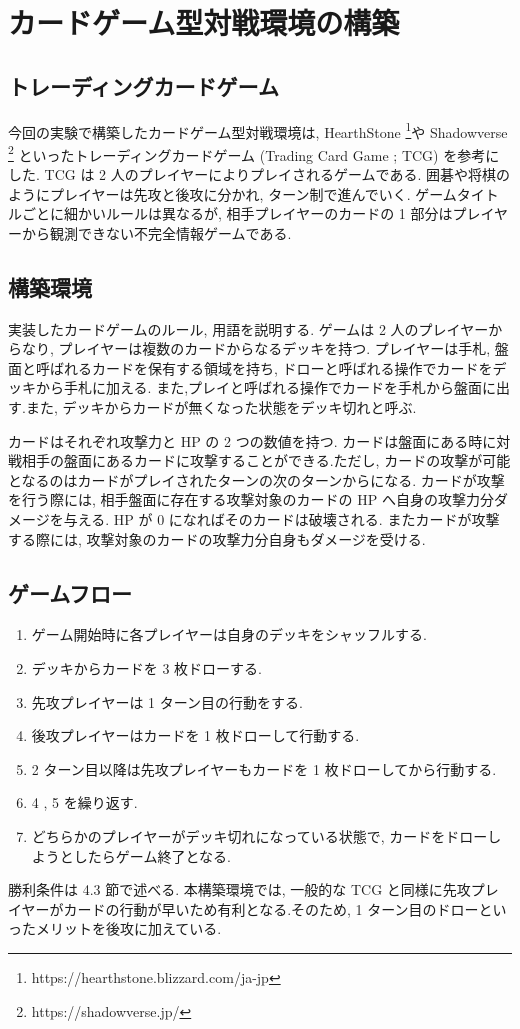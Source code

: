 \documentclass[twocolumn]{jarticle}
\begin{document}
\section{カードゲーム型対戦環境の構築}
\subsection{トレーディングカードゲーム}
今回の実験で構築したカードゲーム型対戦環境は, HearthStone \footnote[1]{https://hearthstone.blizzard.com/ja-jp}や Shadowverse \footnote[2]{https://shadowverse.jp/} といったトレーディングカードゲーム (Trading Card Game ; TCG) を参考にした. TCG は 2 人のプレイヤーによりプレイされるゲームである. 囲碁や将棋のようにプレイヤーは先攻と後攻に分かれ, ターン制で進んでいく. 
ゲームタイトルごとに細かいルールは異なるが, 相手プレイヤーのカードの 1 部分はプレイヤーから観測できない不完全情報ゲームである.

\subsection{構築環境}
実装したカードゲームのルール, 用語を説明する.
ゲームは 2 人のプレイヤーからなり, プレイヤーは複数のカードからなるデッキを持つ.
プレイヤーは手札, 盤面と呼ばれるカードを保有する領域を持ち, ドローと呼ばれる操作でカードをデッキから手札に加える. また,プレイと呼ばれる操作でカードを手札から盤面に出す.また, デッキからカードが無くなった状態をデッキ切れと呼ぶ.
\par
カードはそれぞれ攻撃力と HP の 2 つの数値を持つ. カードは盤面にある時に対戦相手の盤面にあるカードに攻撃することができる.ただし, カードの攻撃が可能となるのはカードがプレイされたターンの次のターンからになる. カードが攻撃を行う際には, 相手盤面に存在する攻撃対象のカードの HP へ自身の攻撃力分ダメージを与える. HP が 0 になればそのカードは破壊される. またカードが攻撃する際には, 攻撃対象のカードの攻撃力分自身もダメージを受ける.

\subsection{ゲームフロー}
\begin{enumerate}
  \setlength{\itemsep}{0cm} %
  \item ゲーム開始時に各プレイヤーは自身のデッキをシャッフルする.
  \item デッキからカードを 3 枚ドローする.
  \item 先攻プレイヤーは 1 ターン目の行動をする.
  \item 後攻プレイヤーはカードを 1 枚ドローして行動する.
  \item 2 ターン目以降は先攻プレイヤーもカードを 1 枚ドローしてから行動する.
  \item 4 , 5 を繰り返す.
  \item どちらかのプレイヤーがデッキ切れになっている状態で, カードをドローしようとしたらゲーム終了となる.
\end{enumerate}
勝利条件は 4.3 節で述べる.
本構築環境では, 一般的な TCG と同様に先攻プレイヤーがカードの行動が早いため有利となる.そのため, 1 ターン目のドローといったメリットを後攻に加えている. 
\end{document}
